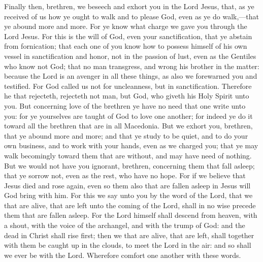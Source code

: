 Finally then, brethren, we beseech and exhort you in the Lord Jesus, that, as ye received of us how ye ought to walk and to please God, even as ye do walk,—that ye abound more and more. For ye know what charge we gave you through the Lord Jesus. For this is the will of God, even your sanctification, that ye abstain from fornication; that each one of you know how to possess himself of his own vessel in sanctification and honor, not in the passion of lust, even as the Gentiles who know not God; that no man transgress, and wrong his brother in the matter: because the Lord is an avenger in all these things, as also we forewarned you and testified. For God called us not for uncleanness, but in sanctification. Therefore he that rejecteth, rejecteth not man, but God, who giveth his Holy Spirit unto you.  But concerning love of the brethren ye have no need that one write unto you: for ye yourselves are taught of God to love one another; for indeed ye do it toward all the brethren that are in all Macedonia. But we exhort you, brethren, that ye abound more and more; and that ye study to be quiet, and to do your own business, and to work with your hands, even as we charged you; that ye may walk becomingly toward them that are without, and may have need of nothing.  But we would not have you ignorant, brethren, concerning them that fall asleep; that ye sorrow not, even as the rest, who have no hope. For if we believe that Jesus died and rose again, even so them also that are fallen asleep in Jesus will God bring with him. For this we say unto you by the word of the Lord, that we that are alive, that are left unto the coming of the Lord, shall in no wise precede them that are fallen asleep. For the Lord himself shall descend from heaven, with a shout, with the voice of the archangel, and with the trump of God: and the dead in Christ shall rise first; then we that are alive, that are left, shall together with them be caught up in the clouds, to meet the Lord in the air: and so shall we ever be with the Lord. Wherefore comfort one another with these words. 

